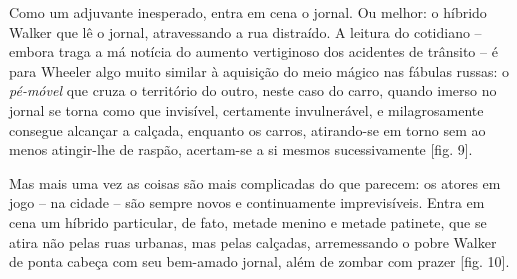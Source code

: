 \begin{multicols}{2}
{{}
}
\par
\par{}Como um adjuvante inesperado,\allowbreak{} entra em cena o jornal.\allowbreak{} Ou melhor:\allowbreak{} o híbrido Walker que lê o jornal,\allowbreak{} atravessando a rua distraído.\allowbreak{} A leitura do cotidiano – embora traga a má notícia do aumento vertiginoso dos acidentes de trânsito – é para Wheeler algo muito similar à aquisição do meio mágico nas fábulas russas:\allowbreak{} o \textit{pé-\allowbreak{}móvel} que cruza o território do outro,\allowbreak{} neste caso do carro,\allowbreak{} quando imerso no jornal se torna como que invisível,\allowbreak{} certamente invulnerável,\allowbreak{} e milagrosamente consegue alcançar a calçada,\allowbreak{} enquanto os carros,\allowbreak{} atirando-\allowbreak{}se em torno sem ao menos atingir-\allowbreak{}lhe de raspão,\allowbreak{} acertam-\allowbreak{}se a si mesmos sucessivamente [fig.\allowbreak{} 9].\allowbreak{}
\par
{
}
\par
\par{}Mas mais uma vez as coisas são mais complicadas do que parecem:\allowbreak{} os atores em jogo – na cidade – são sempre novos e continuamente imprevisíveis.\allowbreak{} Entra em cena um híbrido particular,\allowbreak{} de fato,\allowbreak{} metade menino e metade patinete,\allowbreak{} que se atira não pelas ruas urbanas,\allowbreak{} mas pelas calçadas,\allowbreak{} arremessando o pobre Walker de ponta cabeça com seu bem-\allowbreak{}amado jornal,\allowbreak{} além de zombar com prazer [fig.\allowbreak{} 10].\allowbreak{}

\end{multicols}
